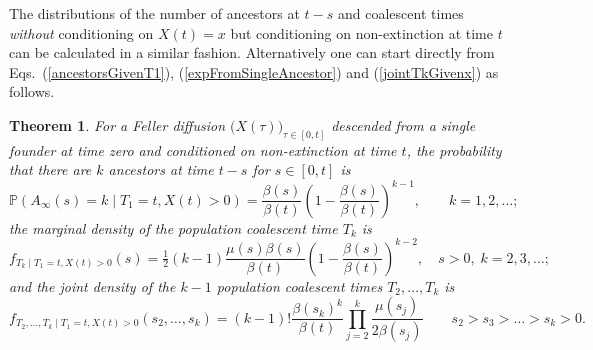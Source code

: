 \documentclass[preprint,12pt]{elsarticle}
\newtheorem{theorem}{Theorem}
\begin{document}
The distributions of the number of ancestors at $t - s$ and coalescent times {\em without} conditioning on $X(t) = x$ but conditioning on non-extinction 
at time $t$ can be calculated in a similar fashion.  Alternatively one can start directly from Eqs.~(\ref{ancestorsGivenT1}), (\ref{expFromSingleAncestor}) 
and (\ref{jointTkGivenx}) as follows.  
\begin{theorem}	\label{theorem:withoutConditioningX}
For a Feller diffusion $\big(X(\tau)\big)_{\tau \in [0, t]}$ descended from a single founder at time zero and conditioned on non-extinction at time $t$, 
the probability that there are $k$ ancestors at time $t - s$ for $s \in [0, t]$ is
\[
 \mathbb{P}(A_\infty(s) = k \mid T_1 = t, X(t) > 0) = \frac{\beta(s)}{\beta(t)} \left(1 - \frac{\beta(s)}{\beta(t)}\right)^{k - 1}, \qquad k = 1, 2, \ldots;  
\]
the marginal density of the population coalescent time $T_k$ is  
\[
f_{T_k \mid T_1 = t, X(t) >0}(s) = \tfrac{1}{2}(k - 1)\frac{\mu(s)\beta(s)}{\beta(t)} \left(1 - \frac{\beta(s)}{\beta(t)}\right)^{k - 2}, 
					\quad s > 0,\; k = 2, 3, \ldots ;
\]
and the joint density of the $k - 1$ population coalescent times $T_2, \ldots, T_k$ is 
\[
f_{T_2, \ldots, T_k \mid T_1 = t, X(t) > 0}(s_2, \ldots, s_k) = (k - 1)! \frac{\beta(s_k)^k}{\beta(t)} \prod_{j = 2}^k \frac{\mu(s_j)}{2\beta(s_j)} 
														\qquad s_2 > s_3 > \ldots > s_k > 0.   
\]
\end{theorem}
%
\end{document}
